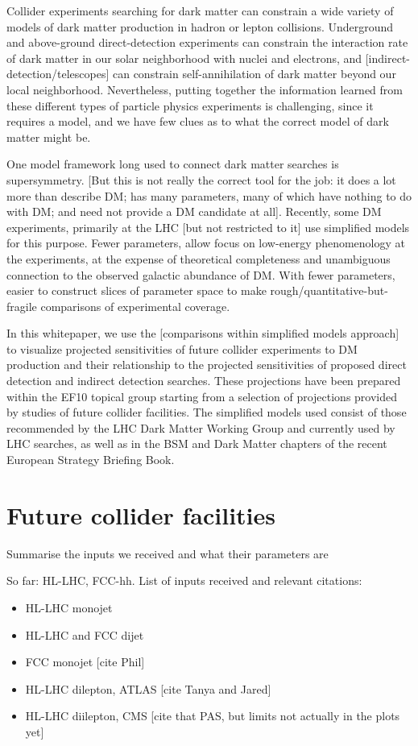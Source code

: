 \documentclass[11pt]{article}
\begin{document}
Collider experiments searching for dark matter can constrain a wide variety of models of dark matter production in hadron or lepton collisions. Underground and above-ground direct-detection experiments can constrain the interaction rate of dark matter in our solar neighborhood with nuclei and electrons, and [indirect-detection/telescopes] can constrain self-annihilation of dark matter beyond our local neighborhood. Nevertheless, putting together the information learned from these different types of particle physics experiments is challenging, since it requires a model, and we have few clues as to what the correct model of  dark matter might be.

One model framework long used to connect dark matter searches is supersymmetry. [But this is not really the correct tool for the job: it does a lot more than describe DM; has many parameters, many of which have nothing to do with DM; and need not provide a DM candidate at all]. Recently, some DM experiments, primarily at the LHC [but not restricted to it] use simplified models for this purpose. Fewer parameters, allow focus on low-energy phenomenology at the experiments, at the expense of theoretical completeness and unambiguous connection to the observed galactic abundance of DM. With fewer parameters, easier to construct slices of parameter space to make rough/quantitative-but-fragile comparisons of experimental coverage.

In this whitepaper, we use the [comparisons within simplified models approach] to visualize projected sensitivities of future collider experiments to DM production and their relationship to the projected sensitivities of proposed direct detection and indirect detection searches. These projections have been prepared within the EF10 topical group starting from a selection of projections provided by studies of future collider facilities. The simplified models used consist of those recommended by the LHC Dark Matter Working Group and currently used by LHC searches, as well as in the BSM and Dark Matter chapters of the recent European Strategy Briefing Book. 

\section{Future collider facilities}
\label{sec:colliders}

Summarise the inputs we received and what their parameters are

So far: HL-LHC, FCC-hh. 
List of inputs received and relevant citations:
\begin{itemize}
    \item HL-LHC monojet~\cite{hllhc-monojet}
    \item HL-LHC and FCC dijet~\cite{Harris:2022kls}
    \item FCC monojet [cite Phil]
    \item HL-LHC dilepton, ATLAS [cite Tanya and Jared]
    \item HL-LHC diilepton, CMS [cite that PAS, but limits not actually in the plots yet]
\end{itemize}
\end{document}

